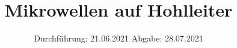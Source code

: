 



\subject{V53}  %
\title{Mikrowellen auf Hohlleiter} %
\date{%
  Durchführung: 21.06.2021
  \hspace{3em}
  Abgabe: 28.07.2021
}



\maketitle
\thispagestyle{empty}
\tableofcontents
\newpage







\printbibliography{}


